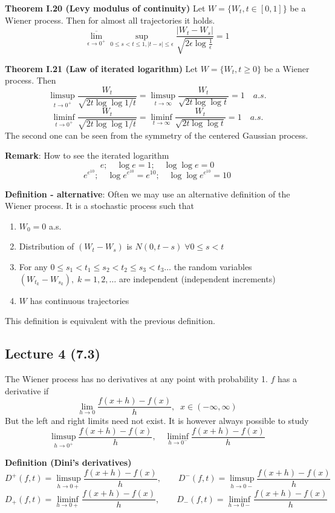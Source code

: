 \documentclass[english]{article}
\newcommand{\note}[1]{\noindent\textbf{#1}}
\begin{document}
\note{Theorem I.20 (Levy modulus of continuity)} Let $W=\{W_t, t\in [0,1]\}$ be a Wiener process. Then for almost all trajectories it holds.
$$\overline{\lim_{\epsilon\to 0^+}} \sup_{0\leq s < t \leq 1, |t-s| \leq \epsilon} \frac {|W_t - W_s|}{\sqrt{2\epsilon \log \frac 1\epsilon}} =  1$$

\note{Theorem I.21 (Law of iterated logarithm)} Let $W=\{W_t, t\geq 0\}$ be a Wiener process. Then
$$\limsup_{t\to 0^+} \frac{W_t}{\sqrt {2t \log \log 1/t}} = \limsup_{t\to \infty} \frac{W_t}{\sqrt{2t \log \log t}} = 1 \quad a.s.$$
$$\liminf_{t\to 0^+} \frac{W_t}{\sqrt {2t \log \log 1/t}} = \liminf_{t\to \infty} \frac{W_t}{\sqrt{2t \log \log t}} = 1 \quad a.s.$$
The second one can be seen from the symmetry of the centered Gaussian process. \newline

\note{Remark}: How to see the iterated logarithm
$$e;\quad \log e = 1; \quad \log \log e = 0$$
$$e^{e^{10}}; \quad \log e^{e^{10}} = e^{10}; \quad \log \log e^{e^{10}} = 10$$

\note{Definition - alternative}: Often we may use an alternative definition of the Wiener process. It is a stochastic process such that \begin{enumerate}
\item $W_0 = 0$ a.s.
\item Distribution of $(W_t - W_s)$ is $N(0,t-s) \; \forall 0\leq s < t$
\item For any $0\leq s_1 < t_1 \leq s_2 < t_2 \leq s_3 < t_3 \dots$ the random variables $(W_{t_k} - W_{s_k}), \; k=1,2,\dots$ are independent (independent increments)
\item $W$ has continuous trajectories
\end{enumerate}
This definition is equivalent with the previous definition.
\subsection*{Lecture 4 (7.3) }
The Wiener process has no derivatives at any point with probability 1. \newline
$f$ has a derivative if
$$\lim_{h\to 0} \frac{f(x+h) - f(x)}{h},\;\; x\in (-\infty, \infty)$$
But the left and right limits need not exist. It is however always possible to study
$$\limsup_{h\to 0^+} \frac{f(x+h) - f(x)}{h},\quad \liminf_{h\to 0^-} \frac{f(x+h) - f(x)}{h}$$

\note{Definition (Dini's derivatives)}
$$D^+(f,t) = \limsup_{h\to 0+}  \frac{f(x+h) - f(x)}{h},\quad\quad D^- (f,t) = \limsup_{h\to 0-}  \frac{f(x+h) - f(x)}{h}$$
$$D_+ (f,t) = \liminf_{h\to 0+}  \frac{f(x+h) - f(x)}{h},\quad\quad D_- (f,t) = \liminf_{h\to 0-}  \frac{f(x+h) - f(x)}{h}$$
\end{document}
